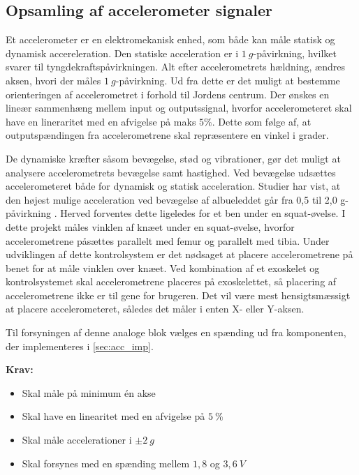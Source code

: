 \subsection{Opsamling af accelerometer signaler} \label{sec:acc_teori}
Et accelerometer er en elektromekanisk enhed, som både kan måle statisk og dynamisk accereleration. 
Den statiske acceleration er i $1~g$-påvirkning, hvilket svarer til tyngdekraftspåvirkningen. 
Alt efter accelerometrets hældning, ændres aksen, hvori der måles $1~g$-påvirkning. 
Ud fra dette er det muligt at bestemme orienteringen af accelerometret i forhold til Jordens centrum. 
Der ønskes en lineær sammenhæng mellem input og outputssignal, hvorfor accelerometeret skal have en lineraritet med en afvigelse på maks $5\%$. Dette som følge af, at outputspændingen fra accelerometrene skal repræsentere en vinkel i grader.

De dynamiske kræfter såsom bevægelse, stød og vibrationer, gør det muligt at analysere accelerometrets bevægelse samt hastighed. 
Ved bevægelse udsættes accelerometeret både for dynamisk og statisk acceleration. 
Studier har vist, at den højest mulige acceleration ved bevægelse af albueleddet går fra 0,5 til 2,0 g-påvirkning \citep{bernmarka2002}. 
Herved forventes dette ligeledes for et ben under en squat-øvelse. 
I dette projekt måles vinklen af knæet under en squat-øvelse, hvorfor accelerometrene påsættes parallelt med femur og parallelt med tibia. Under udviklingen af dette kontrolsystem er det nødsaget at placere accelerometrene på benet for at måle vinklen over knæet. Ved kombination af et exoskelet og kontrolsystemet skal accelerometrene placeres på exoskelettet, så placering af accelerometrene ikke er til gene for brugeren. 
Det vil være mest hensigtsmæssigt at placere accelerometeret, således det måler i enten X- eller Y-aksen. 

Til forsyningen af denne analoge blok vælges en spænding ud fra komponenten, der implementeres i \autoref{sec:acc_imp}.



\vspace{3mm}
\textbf{Krav:}
\begin{itemize}
\item Skal måle på minimum én akse
\item Skal have en linearitet med en afvigelse på $5~\%$
\item Skal måle accelerationer i $\pm 2~g$
\item Skal forsynes med en spænding mellem $1,8$ og $3,6~V$
\end{itemize}